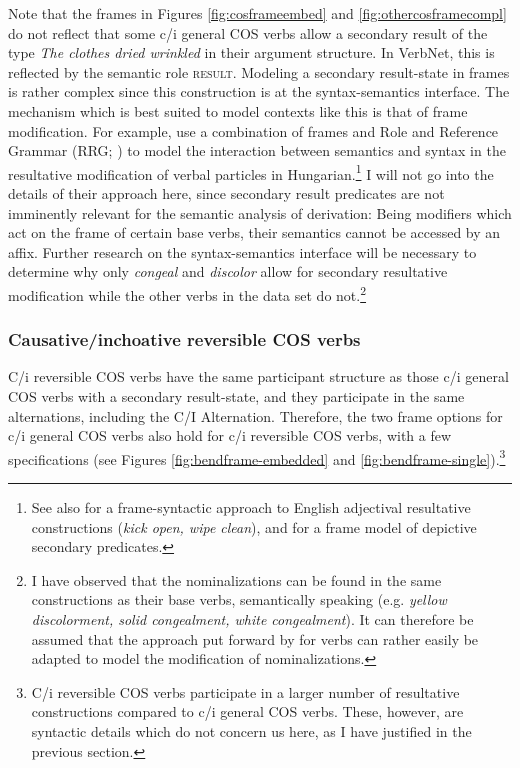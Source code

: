 Note that the frames in Figures \ref{fig:cosframeembed} and \ref{fig:othercosframecompl} do not reflect that some c/i general COS verbs allow a secondary result of the type \textit{The clothes dried wrinkled} in their argument structure. In VerbNet, this is reflected by the semantic role \textsc{result}. 
Modeling a secondary result-state in frames is rather complex since this construction is at the syntax-semantics interface.
The mechanism which is best suited to model contexts like this is that of frame modification. For example, \citet{Balogh.inpress} use a combination of frames and Role and Reference Grammar (RRG; \citealt{VanValin.2005}) to model the interaction between semantics and syntax in the resultative modification of verbal particles in Hungarian.\footnote{See also \citet{Osswald.toappear} for a frame-syntactic approach to English adjectival resultative constructions (\textit{kick open, wipe clean}), and \citet{Petersen.2014} for a frame model of depictive secondary predicates.}
I will not go into the details of their approach here, since secondary result predicates are not imminently relevant for the semantic analysis of derivation: Being modifiers which act on the frame of certain base verbs, their semantics cannot be accessed by an affix. 
Further research on the syntax-semantics interface will be necessary to determine why only \textit{congeal} and \textit{discolor} allow for secondary resultative modification while the other verbs in the data set do not.\footnote{I have observed that the nominalizations can be found in the same constructions as their base verbs, semantically speaking (e.g. \textit{yellow discolorment, solid congealment, white congealment}). It can therefore be assumed that the approach put forward by \citet{Balogh.inpress} for verbs can rather easily be adapted to model the modification of nominalizations.} 

\subsubsection{Causative/inchoative reversible COS verbs}\label{sec:cos-input-frames-c/irevers}

C/i reversible COS verbs have the same participant structure as those c/i general COS verbs with a secondary result-state, and they participate in the same alternations, including the C/I Alternation. Therefore, the two frame options for c/i general COS verbs also hold for c/i reversible COS verbs, with a few specifications (see Figures \ref{fig:bendframe-embedded} and \ref{fig:bendframe-single}).{\footnote{C/i reversible COS verbs participate in a larger number of resultative constructions compared to c/i general COS verbs. These, however, are syntactic details which do not concern us here, as I have justified in the previous section.}} 

